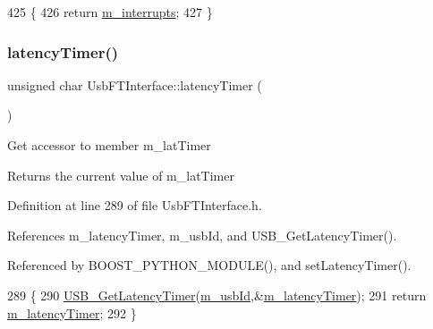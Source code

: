 \begin{DoxyCode}
425                      \{
426     \textcolor{keywordflow}{return} \hyperlink{classUsbFTInterface_a0a6e3a781ead9833a413e230c6f8d1f4}{m\_interrupts};
427   \}
\end{DoxyCode}
\mbox{\label{classUsbFTInterface_a4fa70ce4a4cd4f8f01cdeb4835f11276}} 
\subsubsection{\texorpdfstring{latency\+Timer()}{latencyTimer()}}
{\footnotesize\ttfamily unsigned char Usb\+F\+T\+Interface\+::latency\+Timer (\begin{DoxyParamCaption}{ }\end{DoxyParamCaption})\hspace{0.3cm}{\ttfamily [inline]}}

Get accessor to member m\+\_\+lat\+Timer \begin{DoxyReturn}{Returns}
the current value of m\+\_\+lat\+Timer 
\end{DoxyReturn}


Definition at line 289 of file Usb\+F\+T\+Interface.\+h.



References m\+\_\+latency\+Timer, m\+\_\+usb\+Id, and U\+S\+B\+\_\+\+Get\+Latency\+Timer().



Referenced by B\+O\+O\+S\+T\+\_\+\+P\+Y\+T\+H\+O\+N\+\_\+\+M\+O\+D\+U\+L\+E(), and set\+Latency\+Timer().


\begin{DoxyCode}
289                                 \{
290     \hyperlink{LALUsbML_8h_a90c0ec96b211bb1b45c4b26afe6f6ced}{USB\_GetLatencyTimer}(\hyperlink{classUsbFTInterface_a91df5c0547e8be460bc087e27afe05aa}{m\_usbId},&\hyperlink{classUsbFTInterface_a0eefe6f2cee132da70176562cd126718}{m\_latencyTimer});
291     \textcolor{keywordflow}{return} \hyperlink{classUsbFTInterface_a0eefe6f2cee132da70176562cd126718}{m\_latencyTimer};
292   \}
\end{DoxyCode}
\mbox{\label{classUsbFTInterface_a694f5cb1d38d4369a597ad6761762c0e}} 

